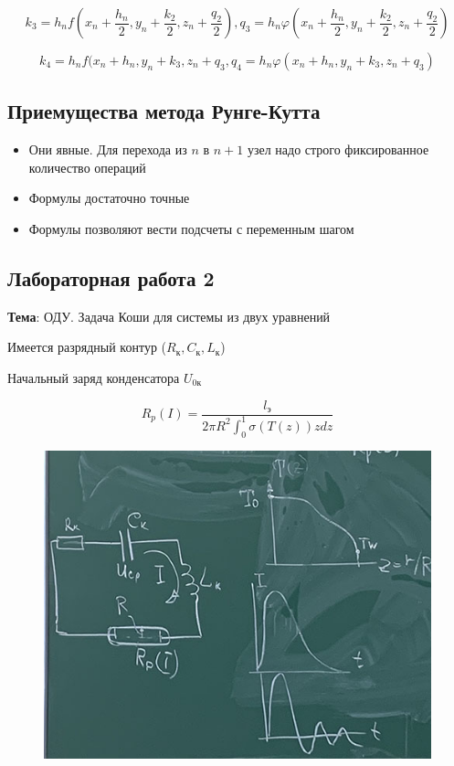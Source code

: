 \begin{equation*}
    k_3 = h_n f (x_n + \frac{h_n}{2}, y_n + \frac{k_2}{2}, z_n + \frac{q_2}{2}), q_3 = h_n \varphi(x_n + \frac{h_n}{2}, y_n + \frac{k_2}{2}, z_n + \frac{q_2}{2})
\end{equation*}

\begin{equation*}
    k_4 = h_n f (x_n + h_n, y_n + k_3, z_n + q_3, q_4 = h_n \varphi(x_n + h_n, y_n + k_3, z_n + q_3)
\end{equation*}

\subsection{Приемущества метода Рунге-Кутта}

\begin{itemize}
    \item Они явные. Для перехода из $n$ в $n+1$ узел надо строго
        фиксированное количество операций
    \item Формулы достаточно точные
    \item Формулы позволяют вести подсчеты с переменным шагом
\end{itemize}

\subsection{Лабораторная работа 2}

\textbf{Тема}: ОДУ. Задача Коши для системы из двух уравнений

Имеется разрядный контур ($R_\text{к}, C_\text{к}, L_\text{к}$)

Начальный заряд конденсатора $U_{0 \text{к}}$

\begin{equation*}
    R_p(I) = \frac{l_{\text{э}}}{2 \pi R^2 \int_0^1 \sigma(T(z))zdz}
\end{equation*}

\begin{figure}[H]
    \centering
    \includegraphics[scale=0.7]{img/lab_02.jpg}
\end{figure}


